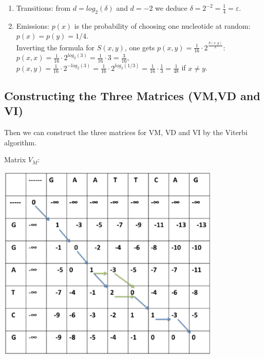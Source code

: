 \documentclass[english, a4paper,11pt]{article}
\begin{document}
\begin{enumerate}
\item Transitions: from $d = log_2(\delta)$ and $d = -2$ we deduce $\delta = 2^{-2} = \frac{1}{4} = \varepsilon$.
\item Emissions: $p(x)$ is the probability of choosing one nucleotide at random: $p(x)=p(y)=1/4$.\\
Inverting the formula for $S(x,y)$, one gets $p(x,y) = \frac{1}{16}\cdot 2^{\frac{S(x,y)}{\lambda}}$: \\
$p(x,x) = \frac{1}{16}\cdot 2^{log_2(3)} = \frac{1}{16}\cdot 3 = \frac{3}{16}$,\\
$p(x,y) = \frac{1}{16} \cdot 2^{-log_2(3)} = \frac{1}{16} \cdot 2^{log_2(1/3)} 
  = \frac{1}{16}\cdot \frac{1}{3} = \frac{1}{48}$ if $x \neq y$.
\end{enumerate}

\subsection{Constructing the Three Matrices (VM,VD and VI)}

Then we can construct the three matrices for VM, VD and VI by the Viterbi algorithm.

Matrix $V_M$:
\begin{center}
\includegraphics[width=0.8\textwidth]{Slide1.eps}
\end{center}
\end{document}
